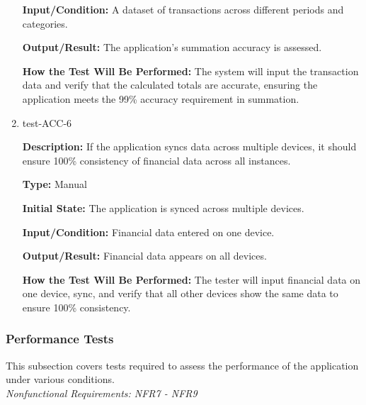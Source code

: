 \documentclass[12pt, titlepage]{article}
\begin{document}
\begin{enumerate}
\textbf{Input/Condition:} A dataset of transactions across different periods and categories.
					
\textbf{Output/Result:} The application's summation accuracy is assessed.
					
\textbf{How the Test Will Be Performed:} The system will input the transaction data and verify that the calculated totals are accurate, ensuring the application meets the 99\% accuracy requirement in summation.

\item{test-ACC-6\\}

\textbf{Description:} If the application syncs data across multiple devices, it should ensure 100\% consistency of financial data across all instances.

\textbf{Type:} Manual
					
\textbf{Initial State:} The application is synced across multiple devices.
					
\textbf{Input/Condition:} Financial data entered on one device.
					
\textbf{Output/Result:} Financial data appears on all devices.
					
\textbf{How the Test Will Be Performed:} The tester will input financial data on one device, sync, and verify that all other devices show the same data to ensure 100\% consistency.

\end{enumerate}

\subsubsection{Performance Tests}

This subsection covers tests required to assess the performance of the application under various conditions.\\
\textit{Nonfunctional Requirements: NFR7 - NFR9}
\end{document}
